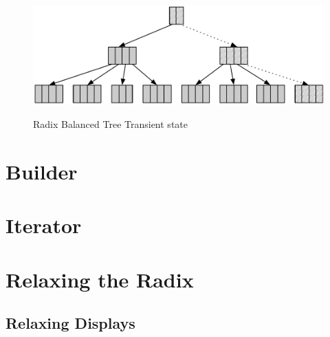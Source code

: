 \begin{figure}[h!]
  \centering
  \includegraphics[width=\textwidth]{Figures/Transient_state}
  \label{Transient_state}
  \caption{Radix Balanced Tree Transient state}
\end{figure}



\section{Builder}




\section{Iterator}



\section{Relaxing the Radix}


\subsection{Relaxing Displays}

